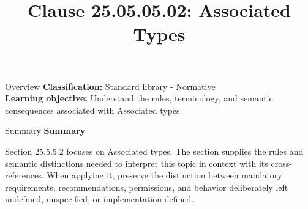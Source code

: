 \documentclass[10pt,letterpaper]{article}
\title{Clause 25.05.05.02: Associated Types}
\author{}
\date{}
\begin{document}
\maketitle
\begin{CornellOverviewBox}{Overview}
\textbf{Classification:} Standard library - Normative\\[2pt]
\textbf{Learning objective:} Understand the rules, terminology, and semantic consequences associated with Associated types.
\end{CornellOverviewBox}\begin{CornellSummaryBox}{Summary}
{\sffamily\bfseries\color{Accent} Summary}\par\vspace{3pt}Section 25.5.5.2 focuses on Associated types. The section supplies the rules and semantic distinctions needed to interpret this topic in context with its cross-references. When applying it, preserve the distinction between mandatory requirements, recommendations, permissions, and behavior deliberately left undefined, unspecified, or implementation-defined.
\end{CornellSummaryBox}
\end{document}

